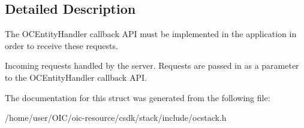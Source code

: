 \subsection{Detailed Description}
The O\+C\+Entity\+Handler callback A\+P\+I must be implemented in the application in order to receive these requests. 

Incoming requests handled by the server. Requests are passed in as a parameter to the O\+C\+Entity\+Handler callback A\+P\+I. 

The documentation for this struct was generated from the following file\+:\begin{DoxyCompactItemize}
\item 
/home/user/\+O\+I\+C/oic-\/resource/csdk/stack/include/ocstack.\+h\end{DoxyCompactItemize}

